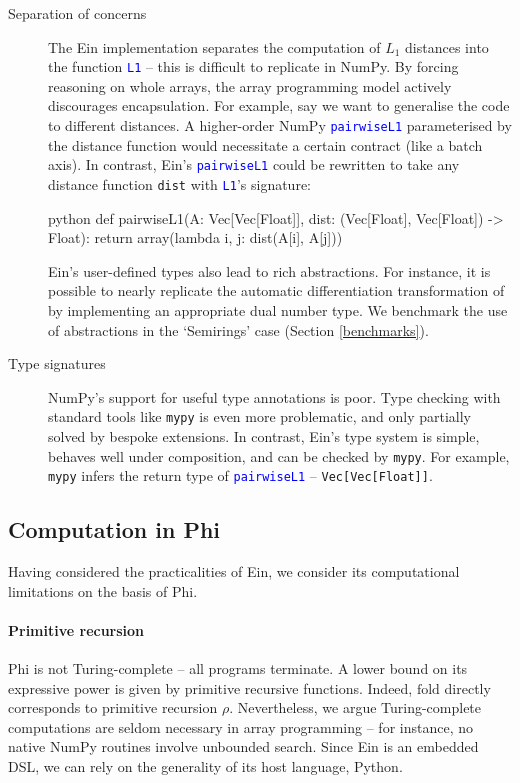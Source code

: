 \begin{description}
    \item[Separation of concerns] The Ein implementation separates the computation of $L_1$ distances into the function \textcolor{blue}{\texttt{L1}} -- this is difficult to replicate in NumPy. By forcing reasoning on whole arrays, the array programming model actively discourages encapsulation. For example, say we want to generalise the code to different distances. A higher-order NumPy \textcolor{blue}{\texttt{pairwiseL1}} parameterised by the distance function would necessitate a certain contract (like a batch axis). In contrast, Ein's \textcolor{blue}{\texttt{pairwiseL1}} could be rewritten to take any distance function \texttt{dist} with \textcolor{blue}{\texttt{L1}}'s signature:
    \begin{center}
    \begin{cminted}{python}
def pairwiseL1(A: Vec[Vec[Float]], dist: (Vec[Float], Vec[Float]) -> Float):
    return array(lambda i, j: dist(A[i], A[j]))
    \end{cminted}
    \end{center}
    Ein's user-defined types also lead to rich abstractions. For instance, it is possible to nearly replicate the automatic differentiation transformation of \textcite{shaikhha2019efficient} by implementing an appropriate dual number type. We benchmark the use of abstractions in the `Semirings' case (Section \ref{benchmarks}).
    \item[Type signatures] NumPy's support for useful type annotations is poor. Type checking with standard tools like \texttt{mypy} is even more problematic, and only partially solved by bespoke extensions. In contrast, Ein's type system is simple, behaves well under composition, and can be checked by \texttt{mypy}. For example, \texttt{mypy} infers the return type of \textcolor{blue}{\texttt{pairwiseL1}} -- \texttt{Vec[Vec[Float]]}. 
\end{description}

\subsection{Computation in Phi}

Having considered the practicalities of Ein, we consider its computational limitations on the basis of Phi. 

\paragraph{Primitive recursion} 
Phi is not Turing-complete -- all programs terminate. 
A lower bound on its expressive power is given by primitive recursive functions. 
Indeed, $\mathrm{fold}$ directly corresponds to primitive recursion $\rho$. 
Nevertheless, we argue Turing-complete computations are seldom necessary in array programming -- for instance, no native NumPy routines involve unbounded search. 
Since Ein is an embedded DSL, we can rely on the generality of its host language, Python. 

